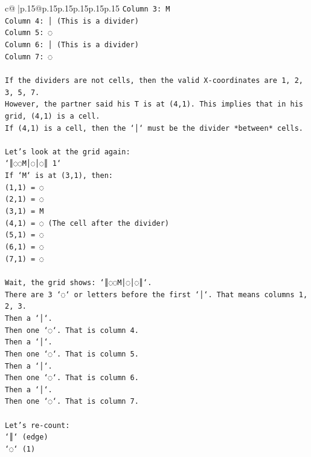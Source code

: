 \documentclass{article}
\begin{document}
{\begin{supertabular}{c@{$\;$}|p{.15\linewidth}@{}p{.15\linewidth}p{.15\linewidth}p{.15\linewidth}p{.15\linewidth}p{.15\linewidth}}
{{{\texttt{Column 3: M} \\
\texttt{Column 4: │ (This is a divider)} \\
\texttt{Column 5: ◌} \\
\texttt{Column 6: │ (This is a divider)} \\
\texttt{Column 7: ◌} \\
\\ 
\texttt{If the dividers are not cells, then the valid X{-}coordinates are 1, 2, 3, 5, 7.} \\
\texttt{However, the partner said his T is at (4,1). This implies that in his grid, (4,1) is a cell.} \\
\texttt{If (4,1) is a cell, then the `│` must be the divider *between* cells.} \\
\\ 
\texttt{Let's look at the grid again:} \\
\texttt{`║◌◌M│◌│◌║ 1`} \\
\texttt{If `M` is at (3,1), then:} \\
\texttt{(1,1) = ◌} \\
\texttt{(2,1) = ◌} \\
\texttt{(3,1) = M} \\
\texttt{(4,1) = ◌ (The cell after the divider)} \\
\texttt{(5,1) = ◌} \\
\texttt{(6,1) = ◌} \\
\texttt{(7,1) = ◌} \\
\\ 
\texttt{Wait, the grid shows: `║◌◌M│◌│◌║`.} \\
\texttt{There are 3 `◌` or letters before the first `│`. That means columns 1, 2, 3.} \\
\texttt{Then a `│`.} \\
\texttt{Then one `◌`. That is column 4.} \\
\texttt{Then a `│`.} \\
\texttt{Then one `◌`. That is column 5.} \\
\texttt{Then a `│`.} \\
\texttt{Then one `◌`. That is column 6.} \\
\texttt{Then a `│`.} \\
\texttt{Then one `◌`. That is column 7.} \\
\\ 
\texttt{Let's re{-}count:} \\
\texttt{`║` (edge)} \\
\texttt{`◌` (1)} \\
}}}
\end{supertabular}}
\end{document}
